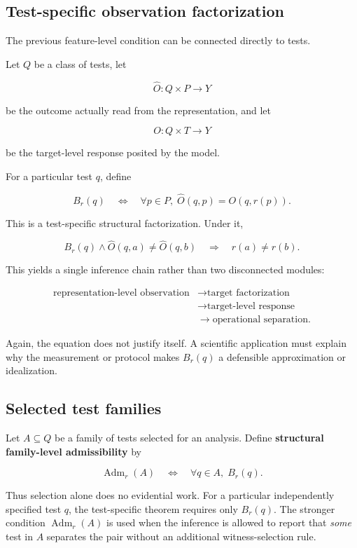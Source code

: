 \documentclass[11pt]{article}
\begin{document}
\subsection{Test-specific observation factorization}

The previous feature-level condition can be connected directly to tests.

Let \(Q\) be a class of tests, let

\[
\widehat O:Q\times P\to Y
\]

be the outcome actually read from the representation, and let

\[
O:Q\times T\to Y
\]

be the target-level response posited by the model.

For a particular test \(q\), define

\[
B_r(q)
\quad\Longleftrightarrow\quad
\forall p\in P,\;
\widehat O(q,p)=O(q,r(p)).
\]

This is a test-specific structural factorization. Under it,

\[
B_r(q)
\land
\widehat O(q,a)\neq \widehat O(q,b)
\quad\Longrightarrow\quad
r(a)\neq r(b).
\]

This yields a single inference chain rather than two disconnected modules:

\[
\begin{aligned}
\text{representation-level observation}
&\to \text{target factorization}\\
&\to \text{target-level response}\\
&\to \text{operational separation}.
\end{aligned}
\]

Again, the equation does not justify itself. A scientific application must explain why the measurement or protocol makes \(B_r(q)\) a defensible approximation or idealization.

\subsection{Selected test families}

Let \(A\subseteq Q\) be a family of tests selected for an analysis. Define \textbf{structural family-level admissibility} by

\[
\operatorname{Adm}_r(A)
\quad\Longleftrightarrow\quad
\forall q\in A,\;B_r(q).
\]

Thus selection alone does no evidential work. For a particular independently specified test \(q\), the test-specific theorem requires only \(B_r(q)\). The stronger condition \(\operatorname{Adm}_r(A)\) is used when the inference is allowed to report that \emph{some} test in \(A\) separates the pair without an additional witness-selection rule.
\end{document}
